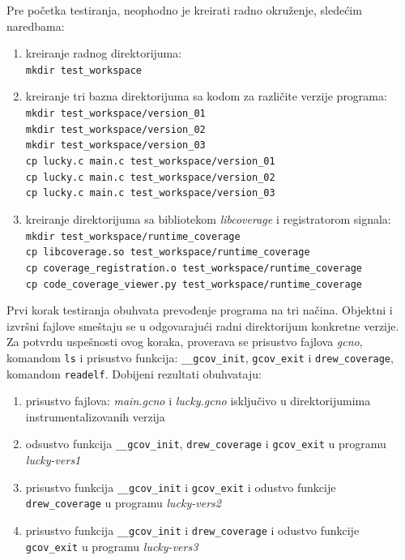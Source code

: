 \documentclass[12pt,oneside]{memoir}
\newcommand{\kod}[1]{\texttt{#1}}
\newcommand{\strano}[1]{\textit{#1}}
\begin{document}
Pre početka testiranja, neophodno je kreirati radno okruženje, sledećim naredbama:
\begin{enumerate}
\item kreiranje radnog direktorijuma: \\
\kod{mkdir test\_workspace}
\item kreiranje tri bazna direktorijuma sa kodom za različite verzije programa: \\
\kod{mkdir test\_workspace/version\_01} \\
\kod{mkdir test\_workspace/version\_02} \\ 
\kod{mkdir test\_workspace/version\_03} \\
\kod{cp lucky.c main.c test\_workspace/version\_01} \\
\kod{cp lucky.c main.c test\_workspace/version\_02} \\
\kod{cp lucky.c main.c test\_workspace/version\_03} 
\item kreiranje direktorijuma sa bibliotekom \strano{libcoverage} i registratorom signala: \\
\kod{mkdir test\_workspace/runtime\_coverage} \\
\kod{cp libcoverage.so test\_workspace/runtime\_coverage} \\
\kod{cp coverage\_registration.o test\_workspace/runtime\_coverage} \\ 
\kod{cp code\_coverage\_viewer.py test\_workspace/runtime\_coverage}
\end{enumerate}

Prvi korak testiranja obuhvata prevođenje programa na tri načina. Objektni i izvršni fajlove smeštaju se u odgovarajući radni direktorijum konkretne verzije. Za potvrdu uspešnosti ovog koraka, proverava se prisustvo fajlova \strano{gcno}, komandom \kod{ls} i prisustvo funkcija: \kod{\_\_gcov\_init}, \kod{gcov\_exit} i \kod{drew\_coverage}, komandom \kod{readelf}. Dobijeni rezultati obuhvataju:
\begin{enumerate}
\item prisustvo fajlova: \strano{main.gcno} i \strano{lucky.gcno} isključivo u direktorijumima instrumentalizovanih verzija
\item odsustvo funkcija \kod{\_\_gcov\_init}, \kod{drew\_coverage} i \kod{gcov\_exit} u programu \strano{lucky-vers1}
\item prisustvo funkcija \kod{\_\_gcov\_init} i \kod{gcov\_exit} i odustvo funkcije \kod{drew\_coverage} u programu \strano{lucky-vers2}
\item prisustvo funkcija \kod{\_\_gcov\_init} i \kod{drew\_coverage} i odustvo funkcije \kod{gcov\_exit} u programu \strano{lucky-vers3}
\end{enumerate}
\end{document}
